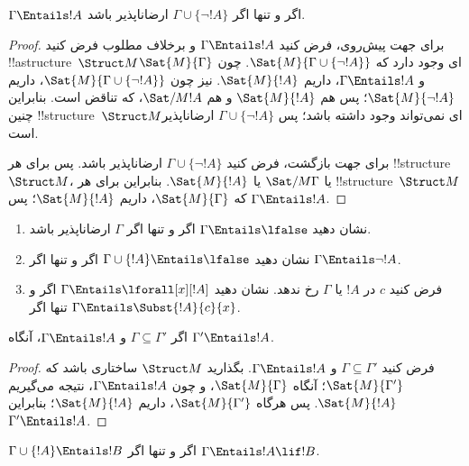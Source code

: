 \documentclass[../../../include/open-logic-section]{subfiles}
\begin{document}
\begin{prop}
$\Gamma \Entails !A$ اگر و تنها اگر $\Gamma \cup \{\lnot !A\}$
ارضاناپذیر باشد.
\end{prop}

\begin{proof}
برای جهت پیش‌روی، فرض کنید $\Gamma \Entails !A$ و برخلاف مطلوب فرض کنید
!!a{structure}~$\Struct M$ای وجود دارد که $\Sat{M}{\Gamma
  \cup \{ \lnot !A \}}$. چون $\Sat{M}{\Gamma}$ و
$\Gamma \Entails !A$، داریم $\Sat{M}{!A}$. نیز چون
$\Sat{M}{\Gamma\cup \{ \lnot !A \}}$، داریم $\Sat{M}{\lnot !A}$؛ پس هم
$\Sat{M}{!A}$ و هم $\Sat/{M}{!A}$، که تناقض است. بنابراین چنین
!!{structure}~$\Struct M$ای نمی‌تواند وجود داشته باشد؛ پس
$\Gamma \cup \{ \lnot !A \}$ ارضاناپذیر است.

برای جهت بازگشت، فرض کنید $\Gamma \cup \{ \lnot !A \}$ ارضاناپذیر باشد.
پس برای هر !!{structure}~$\Struct M$، یا $\Sat/{M}{\Gamma}$ یا
$\Sat{M}{!A}$. بنابراین برای هر !!{structure}~$\Struct M$ که
$\Sat{M}{\Gamma}$، داریم $\Sat{M}{!A}$؛ پس $\Gamma \Entails !A$.
\end{proof}

\begin{prob}
\begin{enumerate}
\item نشان دهید $\Gamma \Entails \lfalse$ اگر و تنها اگر $\Gamma$
ارضاناپذیر باشد.
\item نشان دهید $\Gamma \cup \{!A\} \Entails \lfalse$ اگر و تنها اگر
$\Gamma \Entails \lnot !A$.
\item فرض کنید $c$ در $!A$ یا $\Gamma$ رخ ندهد. نشان دهید
  $\Gamma \Entails \lforall[x][!A]$ اگر و تنها اگر $\Gamma \Entails
  \Subst{!A}{c}{x}$.
\end{enumerate}
\end{prob}

\begin{prop}
اگر $\Gamma \subseteq \Gamma'$ و $\Gamma \Entails !A$، آنگاه
$\Gamma' \Entails !A$.
\end{prop}

\begin{proof}
فرض کنید $\Gamma \subseteq \Gamma'$ و $\Gamma \Entails !A$. بگذارید
$\Struct M$ ساختاری باشد که $\Sat{M}{\Gamma'}$؛ آنگاه
$\Sat{M}{\Gamma}$، و چون $\Gamma \Entails !A$، نتیجه می‌گیریم
$\Sat{M}{!A}$. پس هرگاه $\Sat{M}{\Gamma'}$، داریم $\Sat{M}{!A}$؛
بنابراین $\Gamma' \Entails !A$.
\end{proof}


\begin{thm}
$\Gamma \cup \{!A\} \Entails !B$ اگر و تنها اگر
$\Gamma \Entails !A \lif !B$.
\end{thm}
\end{document}
